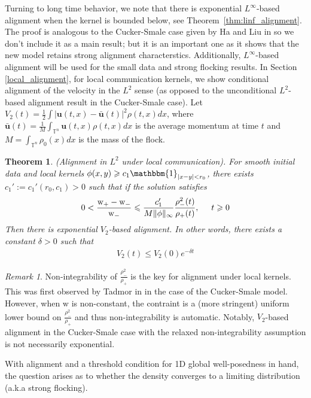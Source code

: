 \documentclass[11pt,letterpaper]{amsart}
\theoremstyle{plain}
\newtheorem{theorem}[THEOREM]{Theorem}
\theoremstyle{definition}
\theoremstyle{remark}
\newtheorem{remark}[THEOREM]{Remark}
\newcommand{\thm}[1]{Theorem~\ref{#1}}
\newcommand{\T}{\ensuremath{\mathbb{T}}}   %
\renewcommand{\geq}{\geqslant}
\renewcommand{\leq}{\leqslant}
\def\T{\mathbb{T}}
\def\u{\textbf{u}}
\def \wt {\mathrm{w}}
\begin{document}
Turning to long time behavior, we note that there is exponential $L^{\infty}$-based alignment when the kernel is bounded below, see \thm{thm:linf_alignment}. 
The proof is analogous to the Cucker-Smale case given by Ha and Liu in \cite{HL2009} so we don't include it as a main result; but it is an important one as it shows 
that the new model retains strong alignment characterstics. Additionally, $L^{\infty}$-based alignment will be used for the 
small data and strong flocking results. In Section \ref{local_alignment}, for local communication kernels, we show conditional alignment of the velocity in the $L^2$ sense
(as opposed to the unconditional $L^2$-based alignment result in the Cucker-Smale case).  
Let $V_2(t) = \frac{1}{2} \int |\u(t,x) - \bar{\u}(t)|^2 \rho(t,x) dx$, where $\bar{\u}(t) = \frac{1}{M} \int_{\T^n} \u(t,x) \rho(t,x) dx$ is the average momentum at time $t$ 
and $M = \int_{\T^n} \rho_0(x) dx$ is the mass of the flock.
\begin{theorem} (Alignment in $L^2$ under local communication).
    \label{thm:l2_alignment_intro}
    For smooth initial data and local kernels $\phi(x,y) \geq c_1 \mathbbm{1}_{|x-y|<r_0}$, there exists $c_1' := c_1'(r_0, c_1) > 0$ such that 
    if the solution satisfies 
    \begin{align*}
        0 < \frac{\wt_+ - \wt_-}{\wt_-} \leq \frac{c_1'}{M \|\phi\|_{\infty}} \frac{\rho_-^2(t)}{\rho_+(t)}, \hspace{5mm} t \geq 0 
    \end{align*}
    Then there is exponential $V_2$-based alignment. In other words, there exists a constant $\delta > 0$ such that  
    \begin{align*}
        V_2(t) \leq V_2(0) e^{-\delta t}
    \end{align*}
\end{theorem}
\begin{remark}
    Non-integrability of $\frac{\rho_-^2}{\rho_+}$ is the key for alignment under local kernels. This was first observed by 
    Tadmor in \cite{Tadmor-notices} in the case of the Cucker-Smale model.  
    However, when $\wt$ is non-constant, the contraint is a (more stringent) uniform lower bound on $\frac{\rho_-^2}{\rho_+}$ and thus non-integrability is automatic.
    Notably, $V_2$-based alignment in the Cucker-Smale case with the relaxed non-integrability assumption is not necessarily exponential.
\end{remark}
With alignment and a threshold condition for 1D global well-posedness in hand, the question arises as to whether the density converges to a limiting distribution (a.k.a strong flocking). 
\end{document}
